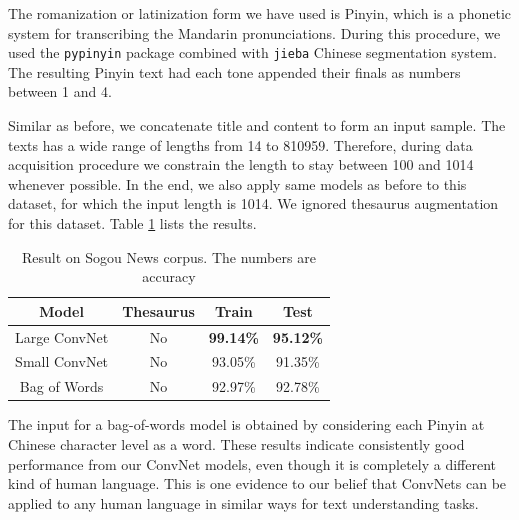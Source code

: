 \documentclass{article}
\begin{document}
\begin{CJK}{UTF8}{gbsn}
The romanization or latinization form we have used is Pinyin, which is a phonetic system for transcribing the Mandarin pronunciations. During this procedure, we used the \verb|pypinyin| package combined with \verb|jieba| Chinese segmentation system. The resulting Pinyin text had each tone appended their finals as numbers between 1 and 4. %

Similar as before, we concatenate title and content to form an input sample. The texts has a wide range of lengths from 14 to 810959. Therefore, during data acquisition procedure we constrain the length to stay between 100 and 1014 whenever possible. In the end, we also apply same models as before to this dataset, for which the input length is 1014. We ignored thesaurus augmentation for this dataset. Table \ref{tab:sogr} lists the results.

\begin{table}[ht]
  \caption{Result on Sogou News corpus. The numbers are accuracy}
  \label{tab:sogr}
  \begin{center}
    \begin{tabular}{cccc}
      \hline
      \abovespace\belowspace
      Model & Thesaurus & Train & Test  \\
      \hline
      \abovespace
      Large ConvNet & No & \textbf{99.14\%} & \textbf{95.12\%} \\
      Small ConvNet & No & 93.05\% & 91.35\% \\
      \belowspace
      Bag of Words & No & 92.97\% & 92.78\% \\
      \hline
    \end{tabular}
  \end{center}
\end{table}

The input for a bag-of-words model is obtained by considering each Pinyin at Chinese character level as a word. These results indicate consistently good performance from our ConvNet models, even though it is completely a different kind of human language. This is one evidence to our belief that ConvNets can be applied to any human language in similar ways for text understanding tasks.


\end{CJK}
\end{document}
